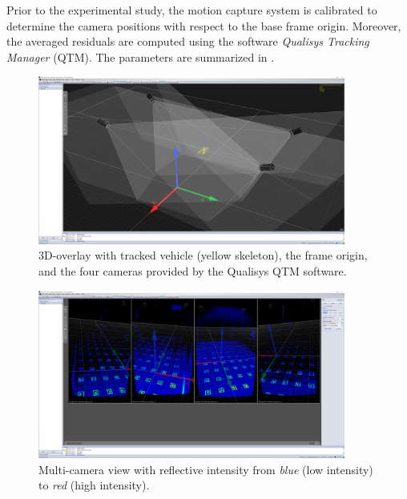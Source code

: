 Prior to the experimental study, the motion capture system is calibrated to determine the camera positions with respect to the base frame origin. 
Moreover, the averaged residuals are computed using the software \textit{Qualisys Tracking Manager} (QTM).
The parameters are summarized in .


\begin{figure}
    \centering
    \includegraphics[width=0.9\textwidth]{images/04/qtm_3d_overlay}
    \caption{3D-overlay with tracked vehicle (yellow skeleton), the frame origin, and the four cameras provided by the Qualisys QTM software.}
    \label{fig:qtm_3d}
\end{figure}

\begin{figure}
    \centering
    \includegraphics[width=0.9\textwidth]{images/04/qtm_multi_cam_intensity}
    \caption{Multi-camera view with reflective intensity from \textit{blue} (low intensity) to \textit{red} (high intensity).}
    \label{fig:qtm_intensity}
\end{figure}


